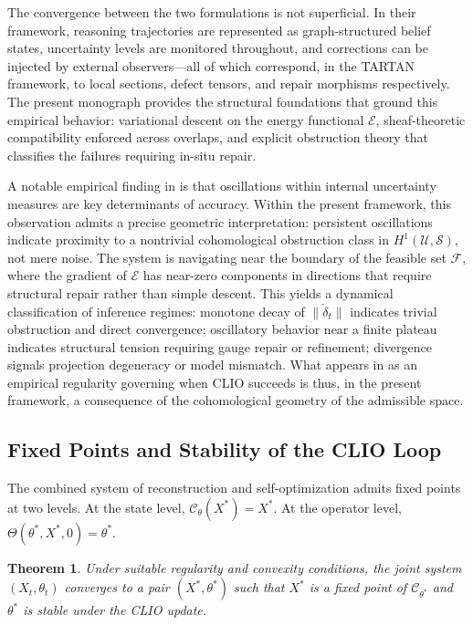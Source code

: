 \documentclass[12pt, oneside]{article}
\newtheorem{theorem}{Theorem}
\begin{document}
The convergence between the two formulations is not superficial. In their framework, reasoning trajectories are represented as graph-structured belief states, uncertainty levels are monitored throughout, and corrections can be injected by external observers---all of which correspond, in the TARTAN framework, to local sections, defect tensors, and repair morphisms respectively. The present monograph provides the structural foundations that ground this empirical behavior: variational descent on the energy functional $\mathcal{E}$, sheaf-theoretic compatibility enforced across overlaps, and explicit obstruction theory that classifies the failures requiring in-situ repair.

A notable empirical finding in \cite{cheng2025clio} is that oscillations within internal uncertainty measures are key determinants of accuracy. Within the present framework, this observation admits a precise geometric interpretation: persistent oscillations indicate proximity to a nontrivial cohomological obstruction class in $H^1(\mathcal{U}, \mathcal{S})$, not mere noise. The system is navigating near the boundary of the feasible set $\mathcal{F}$, where the gradient of $\mathcal{E}$ has near-zero components in directions that require structural repair rather than simple descent. This yields a dynamical classification of inference regimes: monotone decay of $\|\check{\delta}_t\|$ indicates trivial obstruction and direct convergence; oscillatory behavior near a finite plateau indicates structural tension requiring gauge repair or refinement; divergence signals projection degeneracy or model mismatch. What appears in \cite{cheng2025clio} as an empirical regularity governing when CLIO succeeds is thus, in the present framework, a consequence of the cohomological geometry of the admissible space.

\subsection{Fixed Points and Stability of the CLIO Loop}

The combined system of reconstruction and self-optimization admits fixed points at two levels. At the state level, $\mathcal{C}_\theta(X^\ast) = X^\ast$. At the operator level, $\Theta(\theta^\ast, X^\ast, 0) = \theta^\ast$.

\begin{theorem}
Under suitable regularity and convexity conditions, the joint system $(X_t, \theta_t)$ converges to a pair $(X^\ast, \theta^\ast)$ such that $X^\ast$ is a fixed point of $\mathcal{C}_{\theta^\ast}$ and $\theta^\ast$ is stable under the CLIO update.
\end{theorem}
\end{document}
